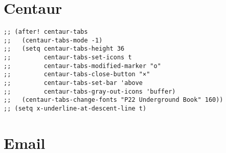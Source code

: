 \documentclass[c]{article}
\theoremstyle{plain}%
\theoremstyle{definition}
\theoremstyle{remark}
\begin{document}
\section{Centaur}
\label{sec:org69ebaeb}
\begin{verbatim}
;; (after! centaur-tabs
;;   (centaur-tabs-mode -1)
;;   (setq centaur-tabs-height 36
;;         centaur-tabs-set-icons t
;;         centaur-tabs-modified-marker "o"
;;         centaur-tabs-close-button "×"
;;         centaur-tabs-set-bar 'above
;;         centaur-tabs-gray-out-icons 'buffer)
;;   (centaur-tabs-change-fonts "P22 Underground Book" 160))
;; (setq x-underline-at-descent-line t)
\end{verbatim}

\section{Email}
\label{sec:org2abef5f}
\end{document}
